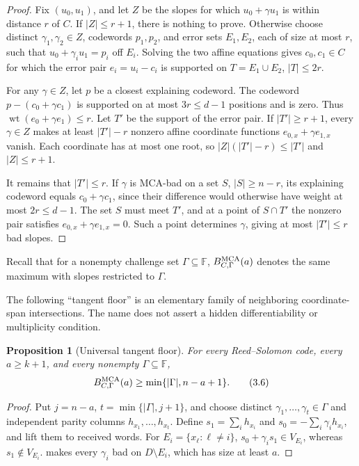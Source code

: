 \documentclass[12pt,a4paper]{amsart}
\numberwithin{equation}{section}
\newtheorem{proposition}[proposition]{Proposition}
\theoremstyle{remark}
\DeclareMathOperator{\wt}{wt}
\newcommand{\F}{\mathbb F}
\newcommand{\abs}[1]{\lvert #1\rvert}
\begin{document}
\begin{proof}
Fix \((u_0,u_1)\), and let \(Z\) be the slopes for which \(u_0+\gamma u_1\)
is within distance \(r\) of \(C\).  If \(\abs Z\le r+1\), there is nothing
to prove.  Otherwise choose distinct \(\gamma_1,\gamma_2\in Z\), codewords
\(p_1,p_2\), and error sets \(E_1,E_2\), each of size at most \(r\), such
that \(u_0+\gamma_i u_1=p_i\) off \(E_i\).  Solving the two affine
equations gives \(c_0,c_1\in C\) for which the error pair
\(e_i=u_i-c_i\) is supported on \(T=E_1\cup E_2\), \(\abs T\le2r\).

For any \(\gamma\in Z\), let \(p\) be a closest explaining codeword.  The
codeword \(p-(c_0+\gamma c_1)\) is supported on at most \(3r\le d-1\)
positions and is zero.  Thus \(\wt(e_0+\gamma e_1)\le r\).  Let \(T'\) be
the support of the error pair.  If \(\abs{T'}\ge r+1\), every
\(\gamma\in Z\) makes at least \(\abs{T'}-r\) nonzero affine coordinate
functions \(e_{0,x}+\gamma e_{1,x}\) vanish.  Each coordinate has at most
one root, so \(\abs Z(\abs{T'}-r)\le\abs{T'}\) and \(\abs Z\le r+1\).

It remains that \(\abs{T'}\le r\).  If \(\gamma\) is MCA-bad on a set
\(S\), \(\abs S\ge n-r\), its explaining codeword equals
\(c_0+\gamma c_1\), since their difference would otherwise have weight at
most \(2r\le d-1\).  The set \(S\) must meet \(T'\), and at a point of
\(S\cap T'\) the nonzero pair satisfies
\(e_{0,x}+\gamma e_{1,x}=0\).  Such a point determines \(\gamma\), giving
at most \(\abs{T'}\le r\) bad slopes.
\end{proof}

Recall that for a nonempty challenge set \(\Gamma\subseteq\F\),
\(B_{C,\Gamma}^{\rm MCA}(a)\) denotes the same maximum with slopes restricted to
\(\Gamma\).

The following ``tangent floor'' is an elementary family of neighboring
coordinate-span intersections.  The name does not assert a hidden
differentiability or multiplicity condition.

\begin{proposition}[Universal tangent floor]\label{prop:universal-tangent-floor}
For every Reed--Solomon code, every \(a\ge k+1\), and every nonempty
\(\Gamma\subseteq\F\),
\[
 B_{C,\Gamma}^{\rm MCA}(a)
 \ge\min\{\abs\Gamma,n-a+1\}.
 \tag{3.6}\label{eq:tangent-floor}
\]
\end{proposition}

\begin{proof}
Put \(j=n-a\), \(t=\min\{\abs\Gamma,j+1\}\), and choose distinct
\(\gamma_1,\ldots,\gamma_t\in\Gamma\) and independent parity columns
\(h_{x_1},\ldots,h_{x_t}\).  Define
\(s_1=\sum_i h_{x_i}\) and \(s_0=-\sum_i\gamma_i h_{x_i}\), and lift them
to received words.  For \(E_i=\{x_\ell:\ell\ne i\}\),
\(s_0+\gamma_i s_1\in V_{E_i}\), whereas \(s_1\notin V_{E_i}\).
 makes every \(\gamma_i\) bad on
\(D\setminus E_i\), which has size at least \(a\).
\end{proof}
\end{document}
